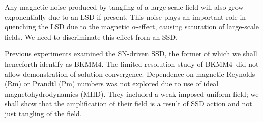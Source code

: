 \documentclass[preprint2]{aastex63}
\newcommand\BKM{{\sf BKMM4}}
\newcommand{\fg}[1]{\textcolor{midgreen}{#1}}
\newcommand{\mm}[1]{\textcolor{mypurple}{#1}}
\begin{document}
 Any magnetic noise produced by tangling \fg{of a large scale field}
 will also grow exponentially due to an LSD if present.
 This noise plays an important role in quenching the LSD due to the magnetic
 $\alpha$-effect, causing saturation of large-scale fields.
 We need to discriminate this effect from an SSD.   

 Previous experiments \citep[e.g.,][]{BKMM04,BalKim05,MacLow:2005}
 examined the SN-driven SSD\fg{, the former of which we shall henceforth
 identify as \BKM}.
 \fg{The limited  resolution} \mm{study} \fg{of \BKM\ did not allow
 demonstration of \mm{solution} convergence.
 Dependence on magnetic Reynolds (Rm) or Prandtl (Pm) numbers was not
 explored due to use of ideal magnetohydrodynamics (MHD).}
 They included a weak imposed uniform field; we shall show
 that the amplification of their field is a result
 of SSD action and not just tangling of the field.
\end{document}
